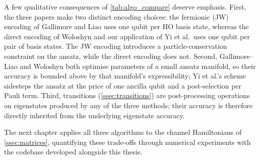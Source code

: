 A few qualitative consequences of \cref{tab:algo_compare} deserve
emphasis. First, the three papers make two distinct encoding choices: the
fermionic (JW) encoding of Gallimore and Liao uses one qubit per HO basis
state, whereas the direct encoding of Woloshyn and our application of Yi
et al.\ uses one qubit per pair of basis states. The JW encoding
introduces a particle-conservation constraint on the ansatz, while the
direct encoding does not. Second, Gallimore--Liao and Woloshyn both
optimise parameters of a small ansatz manifold, so their accuracy is
bounded above by that manifold's expressibility; Yi et al.'s scheme
sidesteps the ansatz at the price of one ancilla qubit and a
post-selection per Pauli term. Third, transitions
(\cref{ssec:transitions}) are post-processing operations on eigenstates
produced by any of the three methods; their accuracy is therefore
directly inherited from the underlying eigenstate accuracy.

The next chapter applies all three algorithms to the channel
Hamiltonians of \cref{ssec:matrices}, quantifying these trade-offs
through numerical experiments with the codebase developed alongside this
thesis.
